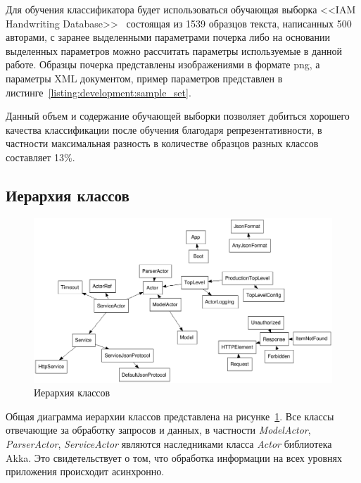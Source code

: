 

Для обучения классификатора будет использоваться обучающая выборка <<IAM Handwriting Database>>~\cite{IAM_handwriting_database} состоящая из 1539 образцов текста, написанных 500 авторами, с заранее выделенными параметрами почерка либо на основании выделенных параметров можно рассчитать параметры используемые в данной работе. Образцы почерка представлены изображениями в формате png, а параметры XML документом, пример параметров представлен в листинге~\ref{listing:development:sample_set}.


Данный объем и содержание обучающей выборки позволяет добиться хорошего качества классификации после обучения благодаря репрезентативности, в частности максимальная разность в количестве образцов разных классов составляет 13\%.

\subsection{Иерархия классов}
\begin{figure}[!ht]
    \centering
    \includegraphics[width=1\textwidth]{figures/classes-fdp.png}
    \caption{Иерархия классов}
    \label{fig:develoipment:class_fdp}
\end{figure}

Общая диаграмма иерархии классов представлена на рисунке~\ref{fig:develoipment:class_fdp}. Все классы отвечающие за обработку запросов и данных, в частности \emph{ModelActor}, \emph{ParserActor}, \emph{ServiceActor} являются наследниками класса \emph{Actor} библиотека Akka. Это свидетельствует о том, что обработка информации на всех уровнях приложения происходит асинхронно.

